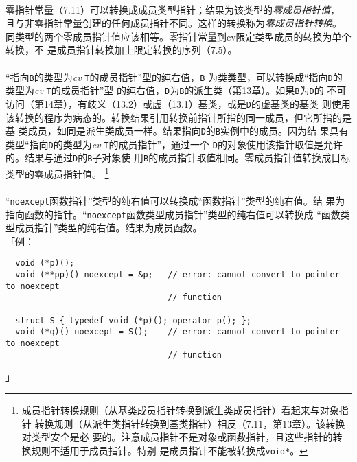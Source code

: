 \paragraph{}
零指针常量（7.11）可以转换成成员类型指针；结果为该类型的\textit{零成员指针值}，
且与非零指针常量创建的任何成员指针不同。这样的转换称为\textit{零成员指针转换}。
同类型的两个零成员指针值应该相等。零指针常量到cv限定类型成员的转换为单个转换，不
是成员指针转换加上限定转换的序列（7.5）。

\paragraph{}
``指向\texttt{B}的类型为\textit{cv} \texttt{T}的成员指针''型的纯右值，\texttt{B}
为类类型，可以转换成``指向\texttt{D}的类型为\textit{cv} \texttt{T}的成员指针''型
的纯右值，\texttt{D}为\texttt{B}的派生类（第13章）。如果\texttt{B}为\texttt{D}的
不可访问（第14章），有歧义（13.2）或虚（13.1）基类，或是\texttt{D}的虚基类的基类
则使用该转换的程序为病态的。转换结果引用转换前指针所指的同一成员，但它所指的是基
类成员，如同是派生类成员一样。结果指向\texttt{D}的\texttt{B}实例中的成员。因为结
果具有类型``指向\texttt{D}的类型为\textit{cv} \texttt{T}的成员指针''，通过一个
\texttt{D}的对象使用该指针取值是允许的。结果与通过\texttt{D}的\texttt{B}子对象使
用\texttt{B}的成员指针取值相同。零成员指针值转换成目标类型的零成员指针值。
\footnote{成员指针转换规则（从基类成员指针转换到派生类成员指针）看起来与对象指针
转换规则（从派生类指针转换到基类指针）相反（7.11，第13章）。该转换对类型安全是必
要的。注意成员指针不是对象或函数指针，且这些指针的转换规则不适用于成员指针。特别
是成员指针不能被转换成\texttt{void*}。}

\paragraph{}
``\texttt{noexcept}函数指针''类型的纯右值可以转换成``函数指针''类型的纯右值。结
果为指向函数的指针。``\texttt{noexcept}函数类型成员指针''类型的纯右值可以转换成
``函数类型成员指针''类型的纯右值。结果为成员函数。                            \\
「例：
\begin{lstlisting}
  void (*p)();
  void (**pp)() noexcept = &p;   // error: cannot convert to pointer to noexcept
                                 // function

  struct S { typedef void (*p)(); operator p(); };
  void (*q)() noexcept = S();    // error: cannot convert to pointer to noexcept
                                 // function
\end{lstlisting}」

